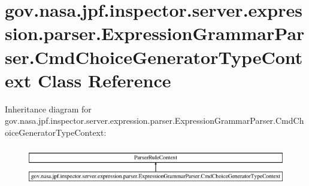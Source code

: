 \hypertarget{classgov_1_1nasa_1_1jpf_1_1inspector_1_1server_1_1expression_1_1parser_1_1_expression_grammar_pa25195f4046c6a14884faf2c870f5b76d}{}\section{gov.\+nasa.\+jpf.\+inspector.\+server.\+expression.\+parser.\+Expression\+Grammar\+Parser.\+Cmd\+Choice\+Generator\+Type\+Context Class Reference}
\label{classgov_1_1nasa_1_1jpf_1_1inspector_1_1server_1_1expression_1_1parser_1_1_expression_grammar_pa25195f4046c6a14884faf2c870f5b76d}
Inheritance diagram for gov.\+nasa.\+jpf.\+inspector.\+server.\+expression.\+parser.\+Expression\+Grammar\+Parser.\+Cmd\+Choice\+Generator\+Type\+Context\+:\begin{figure}[H]
\begin{center}
\leavevmode
\includegraphics[height=1.739130cm]{classgov_1_1nasa_1_1jpf_1_1inspector_1_1server_1_1expression_1_1parser_1_1_expression_grammar_pa25195f4046c6a14884faf2c870f5b76d}
\end{center}
\end{figure}
